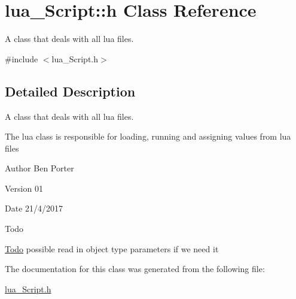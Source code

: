 \hypertarget{classlua___script_1_1h}{}\section{lua\+\_\+\+Script\+:\+:h Class Reference}
\label{classlua___script_1_1h}


A class that deals with all lua files.  




{\ttfamily \#include $<$lua\+\_\+\+Script.\+h$>$}



\subsection{Detailed Description}
A class that deals with all lua files. 

The lua class is responsible for loading, running and assigning values from lua files

\begin{DoxyAuthor}{Author}
Ben Porter 
\end{DoxyAuthor}
\begin{DoxyVersion}{Version}
01 
\end{DoxyVersion}
\begin{DoxyDate}{Date}
21/4/2017 
\end{DoxyDate}
\begin{DoxyRefDesc}{Todo}
\item[\hyperlink{todo__todo000002}{Todo}]possible read in object type parameters if we need it \end{DoxyRefDesc}


The documentation for this class was generated from the following file\+:\begin{DoxyCompactItemize}
\item 
\hyperlink{lua___script_8h}{lua\+\_\+\+Script.\+h}\end{DoxyCompactItemize}
